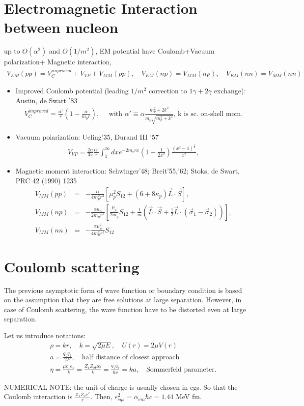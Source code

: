 \documentclass[10pt]{book}
\newcommand{\bea}{\begin{eqnarray}}
\newcommand{\eea}{\end{eqnarray}}
\newcommand{\no}{\nonumber \\}
\begin{document}
\section{Electromagnetic Interaction between nucleon}
up to $O(\alpha^2)$ and $O(1/m^2)$,
EM potential have Coulomb+Vacuum polarization+ Magnetic interaction,
\bea
V_{EM}(pp)=V_C^{improved}+V_{VP}+V_{MM}(pp),
\quad
V_{EM}(np)=V_{MM}(np),\quad
V_{EM}(nn)=V_{MM}(nn)
\eea
\begin{itemize}
\item Improved Coulomb potential
(leading $1/m^2$ correction to $1\gamma+2\gamma$ exchange):
Austin, de Swart ’83
\bea
V_C^{improved}=\frac{\alpha'}{r}\left(1-\frac{\alpha}{m_p r}\right),
\quad \mbox{ with } 
\alpha'\equiv \alpha\frac{m_p^2+2k^2}{m_p\sqrt{m_p^2+k^2}}
\mbox{,  k is sc. on-shell mom.}
\eea
\item Vacuum polarization: Ueling’35, Durand III ’57
\bea
V_{VP}=\frac{2\alpha}{3\pi}\frac{\alpha'}{r}
       \int_1^\infty dx e^{-2 m_e r x}\left(1+\frac{1}{2x^2}\right)
       \frac{(x^2-1)^{\frac{1}{2}}}{x^2},
\eea
\item Magnetic moment interaction:
Schwinger’48; Breit’55,’62; Stoks, de Swart, PRC 42 (1990) 1235
\bea
V_{MM}(pp)&=& -\frac{\alpha}{4 m_p^2 r^3}
      \left[\mu_p^2 S_{12}+(6+8\kappa_p){\vec L}\cdot{\vec S}\right],\no
V_{MM}(np)&=&-\frac{\alpha\kappa_n}{2 m_n r^3}
      \left[\frac{\mu_p}{2m_p}S_{12}+\frac{1}{m}
      \left({\vec L}\cdot{\vec S}+\frac{1}{2}{\vec L}\cdot(\vec{\sigma}_1-\vec{\sigma}_2)\right)
      \right]              ,\no
V_{MM}(nn)&=&-\frac{\alpha\mu_n^2}{4m_n^2 r^3} S_{12}      
\eea
\end{itemize}


\section{Coulomb scattering}
The previous asymptotic form of wave function or boundary condition
is based on the assumption that they are free solutions at large separation. 
However, in case of Coulomb scattering, 
the wave function have to be distorted even at large separation.

Let us introduce notations:
\bea 
& &\rho=k r,\quad k=\sqrt{2\mu E},\quad U(r)=2\mu V(r) \no  
& &a=\frac{q_1 q_2}{2E},\quad \mbox{half distance of closest approach}     \no   
& &\eta=\frac{\mu e_1 e_2}{k}=\frac{Z_1 Z_2 \mu\alpha}{k}
       =\frac{q_1 q_2}{\hbar v}= k a,\quad \mbox{Sommerfeld parameter}. 
\eea 

NUMERICAL NOTE: the unit of charge is usually chosen in cgs. So that the Coulomb interaction is 
$\frac{Z_1 Z_2 e^2}{r}$. Then, $e^2_{cgs}=\alpha_{em}\hbar c=1.44$ MeV fm. 
\end{document}
